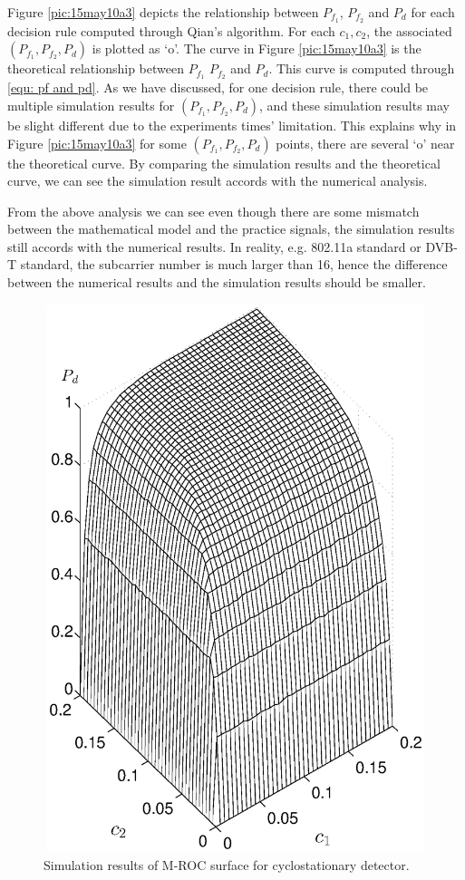 Figure \ref{pic:15may10a3} depicts the relationship between $P_{f_1}$, $P_{f_2}$ and $P_d$ for each decision rule computed through Qian's algorithm.  
For each $c_1, c_2$, the associated $(P_{f_1}, P_{f_2}, P_d) $ is plotted as `o'.
The curve in Figure \ref{pic:15may10a3} is the theoretical relationship between $P_{f_1}$ $P_{f_2}$ and $P_d$. This curve is computed through \eqref{equ: pf and pd}. 
As we have discussed, for one decision rule, there could be multiple simulation results for $(P_{f_1}, P_{f_2}, P_d)$, and these simulation results may be slight different due to the experiments times' limitation. 
This explains why in Figure \ref{pic:15may10a3} for some $(P_{f_1}, P_{f_2}, P_d)$ points, there are several  `o' near the theoretical curve.
By comparing the simulation results and the theoretical curve, we can see the simulation result accords with the numerical analysis. 

From the above analysis we can see even though there are some mismatch between the mathematical model and the practice signals, the simulation results still accords with the numerical results. In reality, e.g. 802.11a standard or DVB-T standard, the subcarrier number is much larger than 16, hence the difference between the numerical results and the simulation results should be  smaller. 


\begin{figure}[!t]
  \centering 
  \includegraphics[width=12cm, height=16cm]{4/Cyc1c2pd.eps}
  \caption{Simulation results of M-ROC surface for cyclostationary detector.}
  \label{pic:15may09a1}
\end{figure}

